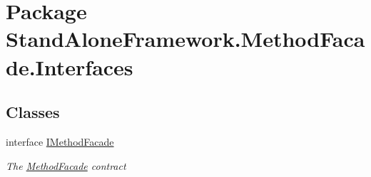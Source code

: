 \hypertarget{namespace_stand_alone_framework_1_1_method_facade_1_1_interfaces}{\section{Package Stand\+Alone\+Framework.\+Method\+Facade.\+Interfaces}
\label{namespace_stand_alone_framework_1_1_method_facade_1_1_interfaces}
}
\subsection*{Classes}
\begin{DoxyCompactItemize}
\item 
interface \hyperlink{interface_stand_alone_framework_1_1_method_facade_1_1_interfaces_1_1_i_method_facade}{I\+Method\+Facade}
\begin{DoxyCompactList}\small\item\em The \hyperlink{class_stand_alone_framework_1_1_method_facade_1_1_method_facade}{Method\+Facade} contract \end{DoxyCompactList}\end{DoxyCompactItemize}
